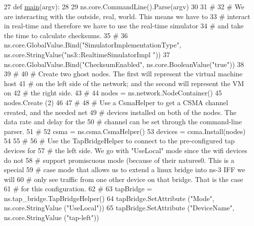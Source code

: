\begin{DoxyCode}
27 \textcolor{keyword}{def }\hyperlink{namespacetap-csma-virtual-machine_a3ca74b02f38b0617a7152031aef45429}{main}(argv):
28 
29     ns.core.CommandLine().Parse(argv)
30 
31     \textcolor{comment}{#}
32     \textcolor{comment}{# We are interacting with the outside, real, world.  This means we have to }
33     \textcolor{comment}{# interact in real-time and therefore we have to use the real-time simulator}
34     \textcolor{comment}{# and take the time to calculate checksums.}
35     \textcolor{comment}{#}
36     ns.core.GlobalValue.Bind(\textcolor{stringliteral}{"SimulatorImplementationType"}, ns.core.StringValue(\textcolor{stringliteral}{"ns3::RealtimeSimulatorImpl
      "}))
37     ns.core.GlobalValue.Bind(\textcolor{stringliteral}{"ChecksumEnabled"}, ns.core.BooleanValue(\textcolor{stringliteral}{"true"}))
38 
39     \textcolor{comment}{#}
40     \textcolor{comment}{# Create two ghost nodes.  The first will represent the virtual machine host}
41     \textcolor{comment}{# on the left side of the network; and the second will represent the VM on }
42     \textcolor{comment}{# the right side.}
43     \textcolor{comment}{#}
44     nodes = ns.network.NodeContainer()
45     nodes.Create (2)
46 
47     \textcolor{comment}{#}
48     \textcolor{comment}{# Use a CsmaHelper to get a CSMA channel created, and the needed net }
49     \textcolor{comment}{# devices installed on both of the nodes.  The data rate and delay for the}
50     \textcolor{comment}{# channel can be set through the command-line parser.}
51     \textcolor{comment}{#}
52     csma = ns.csma.CsmaHelper()
53     devices = csma.Install(nodes)
54 
55     \textcolor{comment}{#}
56     \textcolor{comment}{# Use the TapBridgeHelper to connect to the pre-configured tap devices for }
57     \textcolor{comment}{# the left side.  We go with "UseLocal" mode since the wifi devices do not}
58     \textcolor{comment}{# support promiscuous mode (because of their natures0.  This is a special}
59     \textcolor{comment}{# case mode that allows us to extend a linux bridge into ns-3 IFF we will}
60     \textcolor{comment}{# only see traffic from one other device on that bridge.  That is the case}
61     \textcolor{comment}{# for this configuration.}
62     \textcolor{comment}{#}
63     tapBridge = ns.tap\_bridge.TapBridgeHelper()
64     tapBridge.SetAttribute (\textcolor{stringliteral}{"Mode"}, ns.core.StringValue (\textcolor{stringliteral}{"UseLocal"}))
65     tapBridge.SetAttribute (\textcolor{stringliteral}{"DeviceName"}, ns.core.StringValue (\textcolor{stringliteral}{"tap-left"}))

\end{DoxyCode}
